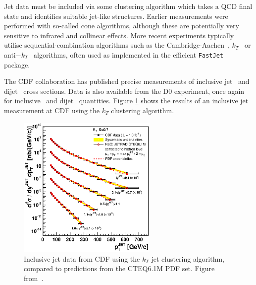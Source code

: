 Jet data must be included via some clustering algorithm which takes a QCD final state and identifies suitable jet-like structures. Earlier measurements were performed with so-called cone algorithms, although these are potentially very sensitive to infrared and collinear effects. More recent experiments typically utilise sequential-combination algorithms such as the Cambridge-Aachen~\cite{Dokshitzer:1997in,Wobisch:1998wt}, $k_T$~\cite{Ellis:1993tq} or anti$-k_T$~\cite{Cacciari:2008gp} algorithms, often used as implemented in the efficient {\tt FastJet}~\cite{Cacciari:2011ma} package.

The CDF collaboration has published precise measurements of inclusive jet~\cite{Abulencia:2007ez,Aaltonen:2008eq} and dijet~\cite{Aaltonen:2008dn} cross sections. Data is also available from the D0 experiment, once again for inclusive~\cite{Abazov:2008ae} and dijet~\cite{Abazov:2010fr} quantities.
Figure \ref{fig:CDFkTJet} shows the results of an inclusive jet measurement at CDF using the $k_T$ clustering algorithm.
\begin{figure}[ht]
\centering
\includegraphics[width=0.6\textwidth]{3-PDFdet/figs/CrossSectionAll.eps}
\caption[Inclusive Jet data from the CDF experiment]{Inclusive jet data from CDF using the $k_T$ jet clustering algorithm, compared to predictions from the CTEQ6.1M PDF set. Figure from~\cite{Abulencia:2007ez}. }
\label{fig:CDFkTJet}
\end{figure}

